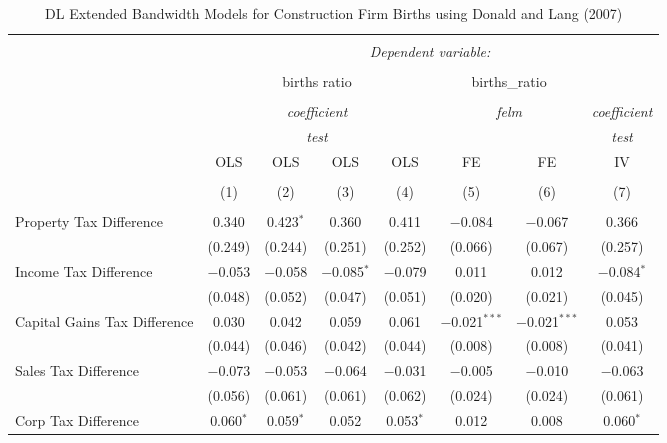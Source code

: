 
\begin{table}[!htbp] \centering 
  \caption{DL Extended Bandwidth Models for  Construction Firm Births using Donald and Lang (2007)} 
  \label{} 
\begin{tabular}{@{\extracolsep{5pt}}lccccccc} 
\\[-1.8ex]\hline 
\hline \\[-1.8ex] 
 & \multicolumn{7}{c}{\textit{Dependent variable:}} \\ 
\cline{2-8} 
\\[-1.8ex] & \multicolumn{4}{c}{births ratio} & \multicolumn{2}{c}{births\_ratio} &   \\ 
\\[-1.8ex] & \multicolumn{4}{c}{\textit{coefficient}} & \multicolumn{2}{c}{\textit{felm}} & \textit{coefficient} \\ 
 & \multicolumn{4}{c}{\textit{test}} & \multicolumn{2}{c}{\textit{}} & \textit{test} \\ 
 & OLS & OLS & OLS & OLS & FE & FE & IV \\ 
\\[-1.8ex] & (1) & (2) & (3) & (4) & (5) & (6) & (7)\\ 
\hline \\[-1.8ex] 
 Property Tax Difference & 0.340 & 0.423$^{*}$ & 0.360 & 0.411 & $-$0.084 & $-$0.067 & 0.366 \\ 
  & (0.249) & (0.244) & (0.251) & (0.252) & (0.066) & (0.067) & (0.257) \\ 
  Income Tax Difference & $-$0.053 & $-$0.058 & $-$0.085$^{*}$ & $-$0.079 & 0.011 & 0.012 & $-$0.084$^{*}$ \\ 
  & (0.048) & (0.052) & (0.047) & (0.051) & (0.020) & (0.021) & (0.045) \\ 
  Capital Gains Tax Difference & 0.030 & 0.042 & 0.059 & 0.061 & $-$0.021$^{***}$ & $-$0.021$^{***}$ & 0.053 \\ 
  & (0.044) & (0.046) & (0.042) & (0.044) & (0.008) & (0.008) & (0.041) \\ 
  Sales Tax Difference & $-$0.073 & $-$0.053 & $-$0.064 & $-$0.031 & $-$0.005 & $-$0.010 & $-$0.063 \\ 
  & (0.056) & (0.061) & (0.061) & (0.062) & (0.024) & (0.024) & (0.061) \\ 
  Corp Tax Difference & 0.060$^{*}$ & 0.059$^{*}$ & 0.052 & 0.053$^{*}$ & 0.012 & 0.008 & 0.060$^{*}$ \\ 

\end{tabular}
\end{table}
